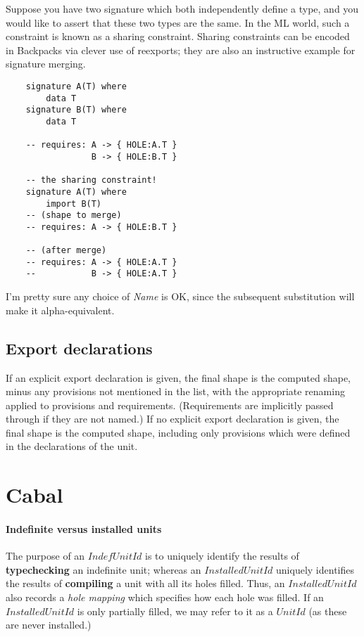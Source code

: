 \documentclass{article}
\newcommand{\I}[1]{\ensuremath{\mathit{#1}}}
\newcommand{\Red}[1]{{\color{red} #1}}
\begin{document}
Suppose you have two signature which both independently define a type,
and you would like to assert that these two types are the same.  In the
ML world, such a constraint is known as a sharing constraint.  Sharing
constraints can be encoded in Backpacks via clever use of reexports;
they are also an instructive example for signature merging.

\begin{verbatim}
    signature A(T) where
        data T
    signature B(T) where
        data T

    -- requires: A -> { HOLE:A.T }
                 B -> { HOLE:B.T }

    -- the sharing constraint!
    signature A(T) where
        import B(T)
    -- (shape to merge)
    -- requires: A -> { HOLE:B.T }

    -- (after merge)
    -- requires: A -> { HOLE:A.T }
    --           B -> { HOLE:A.T }
\end{verbatim}
%
\Red{I'm pretty sure any choice of \textit{Name} is OK, since the
subsequent substitution will make it alpha-equivalent.}

\subsection{Export declarations}

If an explicit export declaration is given, the final shape is the
computed shape, minus any provisions not mentioned in the list, with the
appropriate renaming applied to provisions and requirements.  (Requirements
are implicitly passed through if they are not named.)
If no explicit export declaration is given, the final shape is
the computed shape, including only provisions which were defined
in the declarations of the unit.


\section{Cabal}



\paragraph{Indefinite versus installed units}
The purpose of an \I{IndefUnitId} is to uniquely identify the results of \textbf{typechecking}
an indefinite unit; whereas an \I{InstalledUnitId} uniquely identifies
the results of \textbf{compiling} a unit with all its holes
filled.  Thus, an \I{InstalledUnitId} also records a \emph{hole mapping}
which specifies how each hole was filled.  If an \I{InstalledUnitId}
is only partially filled, we may refer to it as a \I{UnitId} (as these
are never installed.)
\end{document}
